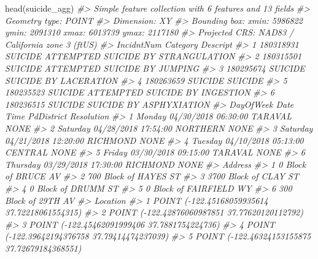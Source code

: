 \documentclass[
]{krantz}
\makeatletter
\newenvironment{Shaded}{\begin{snugshade}}{\end{snugshade}}
\newcommand{\CommentTok}[1]{\textcolor[rgb]{0.37,0.37,0.37}{\textit{#1}}}
\newcommand{\FunctionTok}[1]{\textcolor[rgb]{0,0,0}{#1}}
\newcommand{\NormalTok}[1]{#1}
\newenvironment{kframe}{%
\medskip{}
\setlength{\fboxsep}{.8em}
 \def\at@end@of@kframe{}%
 \ifinner\ifhmode%
  \def\at@end@of@kframe{\end{minipage}}%
  \begin{minipage}{\columnwidth}%
 \fi\fi%
 \def\FrameCommand##1{\hskip\@totalleftmargin \hskip-\fboxsep
 \colorbox{shadecolor}{##1}\hskip-\fboxsep
     \hskip-\linewidth \hskip-\@totalleftmargin \hskip\columnwidth}%
 \MakeFramed {\advance\hsize-\width
   \@totalleftmargin\z@ \linewidth\hsize
   \@setminipage}}%
 {\par\unskip\endMakeFramed%
 \at@end@of@kframe}
\renewenvironment{Shaded}{\begin{kframe}}{\end{kframe}}
\makeatother
\begin{document}
\begin{Shaded}
\begin{Highlighting}[]
\FunctionTok{head}\NormalTok{(suicide\_agg)}
\CommentTok{\#\textgreater{} Simple feature collection with 6 features and 13 fields}
\CommentTok{\#\textgreater{} Geometry type: POINT}
\CommentTok{\#\textgreater{} Dimension:     XY}
\CommentTok{\#\textgreater{} Bounding box:  xmin: 5986822 ymin: 2091310 xmax: 6013739 ymax: 2117180}
\CommentTok{\#\textgreater{} Projected CRS: NAD83 / California zone 3 (ftUS)}
\CommentTok{\#\textgreater{}   IncidntNum Category                           Descript}
\CommentTok{\#\textgreater{} 1  180318931  SUICIDE ATTEMPTED SUICIDE BY STRANGULATION}
\CommentTok{\#\textgreater{} 2  180315501  SUICIDE       ATTEMPTED SUICIDE BY JUMPING}
\CommentTok{\#\textgreater{} 3  180295674  SUICIDE              SUICIDE BY LACERATION}
\CommentTok{\#\textgreater{} 4  180263659  SUICIDE                            SUICIDE}
\CommentTok{\#\textgreater{} 5  180235523  SUICIDE     ATTEMPTED SUICIDE BY INGESTION}
\CommentTok{\#\textgreater{} 6  180236515  SUICIDE            SUICIDE BY ASPHYXIATION}
\CommentTok{\#\textgreater{}   DayOfWeek       Date     Time PdDistrict Resolution}
\CommentTok{\#\textgreater{} 1    Monday 04/30/2018 06:30:00    TARAVAL       NONE}
\CommentTok{\#\textgreater{} 2  Saturday 04/28/2018 17:54:00   NORTHERN       NONE}
\CommentTok{\#\textgreater{} 3  Saturday 04/21/2018 12:20:00   RICHMOND       NONE}
\CommentTok{\#\textgreater{} 4   Tuesday 04/10/2018 05:13:00    CENTRAL       NONE}
\CommentTok{\#\textgreater{} 5    Friday 03/30/2018 09:15:00    TARAVAL       NONE}
\CommentTok{\#\textgreater{} 6  Thursday 03/29/2018 17:30:00   RICHMOND       NONE}
\CommentTok{\#\textgreater{}                   Address}
\CommentTok{\#\textgreater{} 1     0 Block of BRUCE AV}
\CommentTok{\#\textgreater{} 2   700 Block of HAYES ST}
\CommentTok{\#\textgreater{} 3   3700 Block of CLAY ST}
\CommentTok{\#\textgreater{} 4     0 Block of DRUMM ST}
\CommentTok{\#\textgreater{} 5 0 Block of FAIRFIELD WY}
\CommentTok{\#\textgreater{} 6    300 Block of 29TH AV}
\CommentTok{\#\textgreater{}                                         Location}
\CommentTok{\#\textgreater{} 1  POINT ({-}122.45168059935614 37.72218061554315)}
\CommentTok{\#\textgreater{} 2  POINT ({-}122.42876060987851 37.77620120112792)}
\CommentTok{\#\textgreater{} 3   POINT ({-}122.45462091999406 37.7881754224736)}
\CommentTok{\#\textgreater{} 4  POINT ({-}122.39642194376758 37.79414474237039)}
\CommentTok{\#\textgreater{} 5  POINT ({-}122.46324153155875 37.72679184368551)}

\end{Highlighting}
\end{Shaded}
\end{document}
